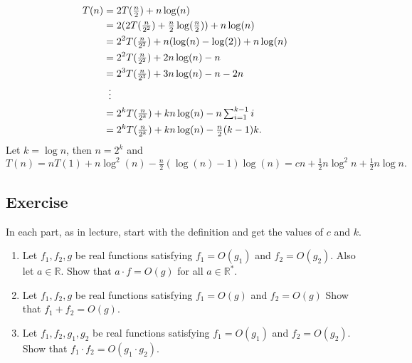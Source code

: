 \documentclass{article}
\newcounter{counter}
\newcommand{\Exercise}{Exercise \stepcounter{counter}\thecounter}
\begin{document}
\begin{enumerate}
        $$\begin{aligned}[t]
            T(n) &= 2T(\tfrac{n}{2}) + n \log(n) \\
            &= 2(2T(\tfrac{n}{2^2}) + \tfrac{n}{2}\log(\tfrac{n}{2})) + n\log(n) \\
            &= 2^{2}T(\tfrac{n}{2^{2}}) + n(\log(n) - \log(2)) + n\log(n) \\
            &= 2^{2}T(\tfrac{n}{2^{2}}) + 2n\log(n) - n \\
            &= 2^{3}T(\tfrac{n}{2^{3}}) + 3n\log(n) - n - 2n \\
            &\vdotswithin{ = } \\
            &= 2^{k}T(\tfrac{n}{2^{k}}) + kn \log(n) - n\textstyle\sum_{i = 1}^{k - 1} i \\
            &= 2^{k}T(\tfrac{n}{2^{k}}) + kn \log(n) - \tfrac{n}{2}(k - 1)k.
        \end{aligned}$$
        Let $k = \log n$, then $n = 2^{k}$ and  $$T(n) = nT(1) + n\log^{2}(n) - \tfrac{n}{2}(\log(n) - 1)\log(n) = cn + \tfrac{1}{2}n \log^{2}n + \tfrac{1}{2}n\log{n}.$$
    \end{enumerate}

\subsection*{\Exercise}
    In each part, as in lecture, start with the definition and get the values of $c$ and $k$.
    \begin{enumerate}
        \item Let $f_{1}, f_{2}, g$ be real functions satisfying $f_{1} = O(g_{1})$ and $f_{2} = O(g_{2})$. Also let $a \in \mathbb{R}$. Show that $a \cdot f = O(g)$ for all $a \in \mathbb{R}^{*}$.
        \item Let $f_{1}, f_{2}, g$ be real functions satisfying $f_{1} = O(g)$ and $f_{2} = O(g)$ Show that $f_{1} + f_{2} = O(g)$.
        \item Let $f_{1}, f_{2}, g_{1}, g_{2}$ be real functions satisfying $f_{1} = O(g_{1})$ and $f_{2} = O(g_{2})$. Show that $f_{1} \cdot f_{2} = O(g_{1} \cdot g_{2})$.
    \end{enumerate}
\end{document}
